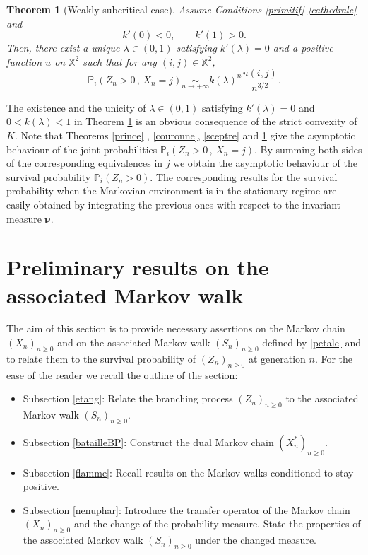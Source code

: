\documentclass[12pt]{amsart}
\newtheorem{theorem}{Theorem}[section]
\theoremstyle{definition}
\numberwithin{equation}{section}
\def\bb#1{\mathbb{#1}}
\def\bs#1{\boldsymbol{#1}}
\def\geq{\geqslant}
\renewcommand\ll{\lambda}
\begin{document}
\begin{theorem}[Weakly subcritical case]
\label{cape}
Assume Conditions \ref{primitif}-\ref{cathedrale} and
\[
k'(0) < 0, \qquad k'(1) > 0.
\]
Then, there exist a unique $\ll \in (0,1)$ satisfying $k'(\ll)=0$ and a positive function $u$  on $\bb X^2$ such that for any $(i,j) \in \bb X^2$,
\[
\bb P_i \left( Z_n > 0 \,,\, X_n = j \right) \underset{n \to +\infty}{\sim} k(\ll)^n \frac{u(i,j)}{n^{3/2}}.
\]
\end{theorem}

The existence and the unicity of $\ll \in (0,1)$ satisfying $k'(\ll)=0$ and $0< k(\ll) < 1$ in Theorem \ref{cape} is an obvious consequence of the strict convexity of $K$. Note that Theorems \ref{prince} , \ref{couronne}, \ref{sceptre} and \ref{cape} give the asymptotic behaviour of the joint probabilities $\bb P_i \left( Z_n > 0 \,,\, X_n = j\right)$. By summing both sides of the corresponding equivalences in $j$ we obtain the asymptotic behaviour of the survival probability $\mathbb P_i \left( Z_n>0 \right)$. The corresponding results for the survival probability when the Markovian environment is in the stationary regime are easily obtained by integrating the previous ones with respect to the invariant measure $\bs \nu$.


\section{Preliminary results on the associated Markov walk}
\label{prliminrez}


The aim of this section is to provide necessary assertions on the Markov chain $(X_n)_{n\geq 0}$ and on the associated Markov walk $(S_n)_{n\geq 0}$ defined by \eqref{petale} and to relate them to the survival probability of  $(Z_n)_{n\geq 0}$ at generation $n$. For the ease of the reader we recall the outline of the section:
\begin{itemize}
\item Subsection \ref{etang}: Relate the branching process $(Z_n)_{n\geq 0}$ to the associated Markov walk $(S_n)_{n\geq 0}$. 
\item Subsection \ref{batailleBP}: Construct the dual Markov chain $( X_n^* )_{n\geq 0}$. 
\item Subsection \ref{flamme}: Recall results on the Markov walks  conditioned to stay positive.
\item Subsection \ref{nenuphar}: Introduce the transfer operator of the Markov chain $(X_n)_{n\geq 0}$ and the change of the probability measure. State the properties of the associated Markov walk $(S_n)_{n\geq 0}$ under the changed measure.
\end{itemize}
\end{document}
